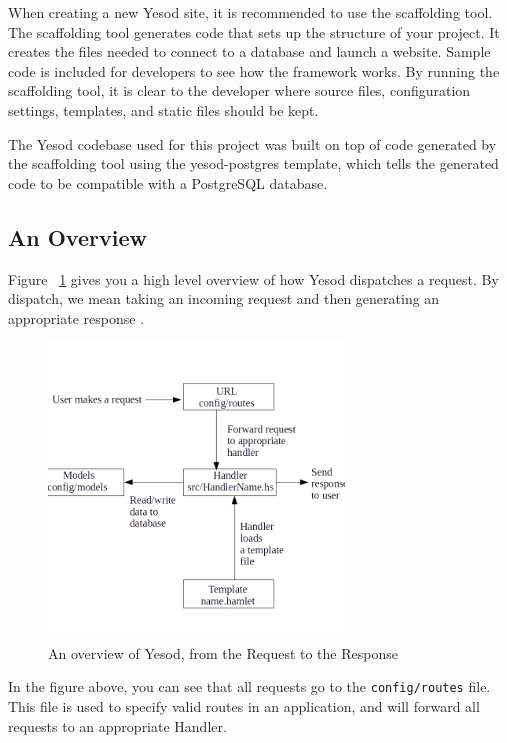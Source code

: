 When creating a new Yesod site, it is recommended to use the scaffolding tool.
The scaffolding tool generates code that sets up the structure of your project. It
creates the files needed to connect to a database and launch a website. Sample code
is included for developers to see how the framework works. By running the scaffolding
tool, it is clear to the developer where source files, configuration settings, templates, and 
static files should be kept. \parencite[Scaffolding and the Site Template]{yesodBook}

The Yesod codebase used for this project was built on top of code generated by the
scaffolding tool using the yesod-postgres template, which tells the generated code
to be compatible with a PostgreSQL database.

\subsection{An Overview}

Figure ~\ref{fig:yesodOverview} gives you a high level overview of how Yesod
dispatches a request. By dispatch, we mean taking an incoming request and
then generating an appropriate response \parencite[Understanding a Request]{yesodBook}.

\begin{figure}[H]
	\centering
	\includegraphics[width=0.7\textwidth]{final_report/pics/yesod_diagram.png}
	\caption{An overview of Yesod, from the Request to the Response}
	\label{fig:yesodOverview}
\end{figure}

In the figure above, you can see that all requests go to the \texttt{config/routes}
file. This file is used to specify valid routes in an application, and will
forward all requests to an appropriate Handler. \parencite[Understanding a Request]{yesodBook}

